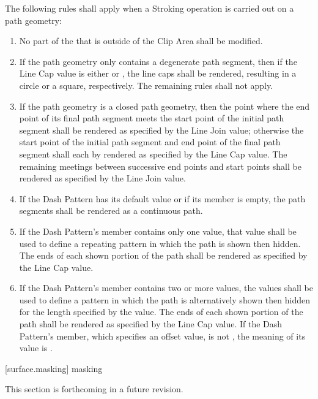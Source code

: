 \pnum
The following rules shall apply when a Stroking operation is carried out on a path geometry:
\begin{enumerate}
\item No part of the \underlyingsurface that is outside of the Clip Area shall be modified.

\item If the path geometry only contains a degenerate path segment, then if the Line Cap value is either  or , the line caps shall be rendered, resulting in a circle or a square, respectively. The remaining rules shall not apply.

\item If the path geometry is a closed path geometry, then the point where the end point of its final path segment meets the start point of the initial path segment shall be rendered as specified by the Line Join value; otherwise the start point of the initial path segment and end point of the final path segment shall each by rendered as specified by the Line Cap value. The remaining meetings between successive end points and start points shall be rendered as specified by the Line Join value.

\item If the Dash Pattern has its default value or if its  member is empty, the path segments shall be rendered as a continuous path.

\item If the Dash Pattern's  member contains only one value, that value shall be used to define a repeating pattern in which the path is shown then hidden. The ends of each shown portion of the path shall be rendered as specified by the Line Cap value.

\item If the Dash Pattern's  member contains two or more values, the values shall be used to define a pattern in which the path is alternatively shown then hidden for the length specified by the value. The ends of each shown portion of the path shall be rendered as specified by the Line Cap value. If the Dash Pattern's  member, which specifies an offset value, is not , the meaning of its value is .
\end{enumerate}

 [surface.masking] { masking}

\pnum
This section is forthcoming in a future revision.

